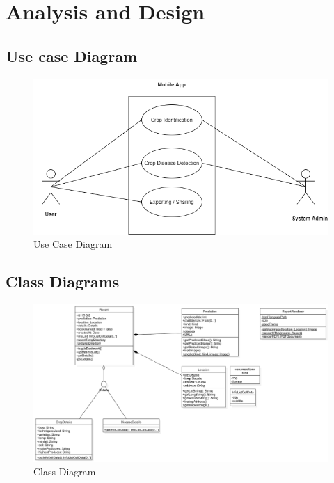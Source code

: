 \documentclass[../Report.tex]{subfiles}
\begin{document}
\chapter{Analysis and Design}

\section{Use case Diagram}
\begin{figure}[H]
    \includegraphics[width=0.8\linewidth]{images/usecase.png}
    \caption{Use Case Diagram}
    \label{fig:usecase}
\end{figure}

\section{Class Diagrams}
\begin{figure}[H]
    \includegraphics[width=0.8\linewidth]{images/class.png}
    \caption{Class Diagram}
    \label{fig:class}
\end{figure}
\end{document}
